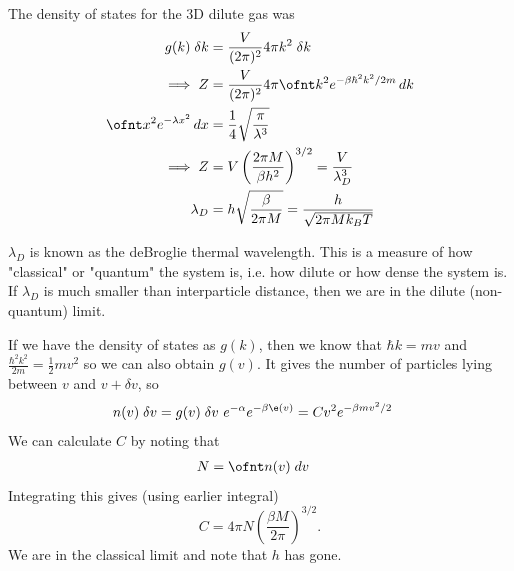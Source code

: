 \documentclass[a4paper, 11pt, normalem]{report}
\begin{document}
\begin{example}
    The density of states for the 3D dilute gas was
    \begin{align}
        g(k)\;\delta k &= \frac{V}{(2\pi)^2}4\pi k^2\;\delta k \\
        \implies Z &= \frac{V}{(2\pi)^2}4\pi \ofnt k^2e^{-\beta\hbar^2k^2/2m}\,dk \\
        \ofnt x^2e^{-\lambda x^2}\,dx &= \frac{1}{4}\sqrt{\frac{\pi}{\lambda^3}} \\
        \implies Z &= V\left(\frac{2\pi M}{\beta h^2}\right)^{3/2} = \frac{V}{\lambda_D^3} \\
        \lambda_D &= h\sqrt{\frac{\beta}{2\pi M}} = \frac{h}{\sqrt{2\pi Mk_BT}}
    \end{align}
\end{example}
$\lambda_D$ is known as the deBroglie thermal wavelength. 
This is a measure of how "classical" or "quantum" the system is, i.e. how dilute or how dense the system is. 
If $\lambda_D$ is much smaller than interparticle distance, then we are in the dilute (non-quantum) limit.

If we have the density of states as $g(k)$, then we know that $\hbar k = mv$ and $\frac{\hbar^2k^2}{2m} = \frac{1}{2}mv^2$ so we can also obtain $g(v)$.
It gives the number of particles lying between $v$ and $v+\delta v$, so
\begin{align}
    n(v)\;\delta v &= g(v)\;\delta v ~e^{-\alpha}e^{-\beta\e(v)} = Cv^2e^{-\beta mv^2/2}
\end{align}
We can calculate $C$ by noting that 
\begin{align}
    N &= \ofnt n(v)\;dv
\end{align}
Integrating this gives (using earlier integral)
\begin{equation}
    C = 4\pi N\left(\frac{\beta M}{2\pi}\right)^{3/2}.
\end{equation}
We are in the classical limit and note that $h$ has gone. 
\end{document}
